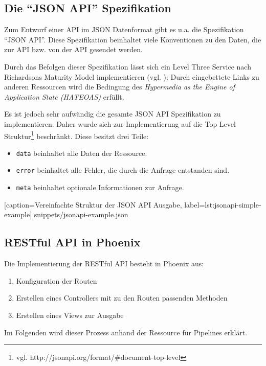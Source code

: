 \subsection{Die ``JSON API'' Spezifikation}
\label{subsec:jsonapi}

Zum Entwurf einer API im JSON Datenformat gibt es u.a. die Spezifikation ``JSON API''. Diese Spezifikation beinhaltet viele Konventionen zu den Daten, die zur API bzw. von der API gesendet werden.

Durch das Befolgen dieser Spezifikation lässt sich ein Level Three Service nach Richardsons Maturity Model implementieren (vgl. \citep[20]{Webber2010}): Durch eingebettete Links zu anderen Ressourcen wird die Bedingung des \emph{Hypermedia as the Engine of Application State (HATEOAS)} erfüllt.

Es ist jedoch sehr aufwändig die gesamte JSON API Spezifikation zu implementieren. Daher wurde sich zur Implementierung auf die Top Level Struktur\footnote{vgl. http://jsonapi.org/format/\#document-top-level} beschränkt. Diese besitzt drei Teile:

\begin{itemize}
  \item \texttt{data} beinhaltet alle Daten der Ressource.
  \item \texttt{error} beinhaltet alle Fehler, die durch die Anfrage entstanden sind.
  \item \texttt{meta} beinhaltet optionale Informationen zur Anfrage.
\end{itemize}


  [caption={Vereinfachte Struktur der JSON API Ausgabe},
  label={lst:jsonapi-simple-example}]
  {snippets/jsonapi-example.json}

\subsection{RESTful API in Phoenix}

Die Implementierung der RESTful API besteht in Phoenix aus:

\begin{enumerate}
  \item Konfiguration der Routen
  \item Erstellen eines Controllers mit zu den Routen passenden Methoden
  \item Erstellen eines Views zur Ausgabe
\end{enumerate}

Im Folgenden wird dieser Prozess anhand der Ressource für Pipelines erklärt.

